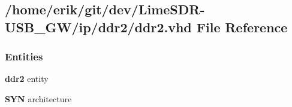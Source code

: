 \subsection{/home/erik/git/dev/\+Lime\+S\+D\+R-\/\+U\+S\+B\+\_\+\+G\+W/ip/ddr2/ddr2.vhd File Reference}
\label{ddr2_8vhd}
\subsubsection*{Entities}
\begin{DoxyCompactItemize}
\item 
{\bf ddr2} entity
\item 
{\bf S\+YN} architecture
\end{DoxyCompactItemize}
